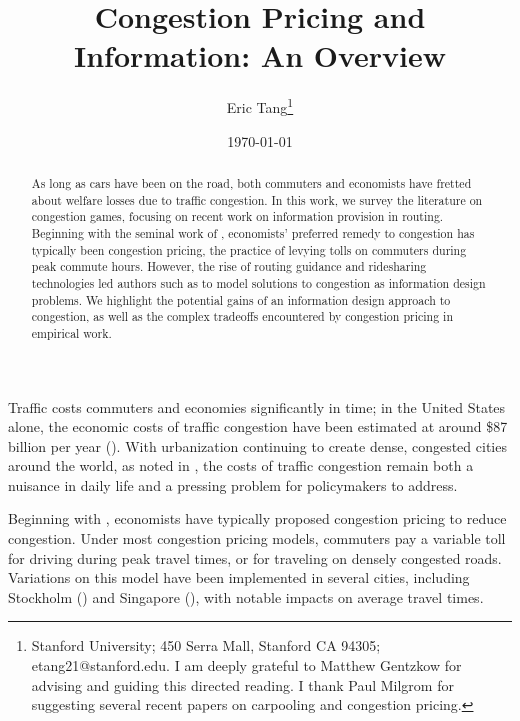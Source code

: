 \documentclass[JEL]{AEA}
\begin{document}
\title{Congestion Pricing and Information: An Overview}
\author{Eric Tang\thanks{%
Stanford University; 450 Serra Mall, Stanford CA 94305; etang21@stanford.edu.
I am deeply grateful to Matthew Gentzkow for advising and guiding this directed reading. I thank Paul Milgrom for suggesting several recent papers on carpooling and congestion pricing.
}}
\date{\today}
\pubVolume{}
\pubIssue{}

\begin{abstract}
As long as cars have been on the road, both commuters and economists have fretted about welfare losses due to traffic congestion. In this work, we survey the literature on congestion games, focusing on recent work on information provision in routing. Beginning with the seminal work of \cite{vickrey-1969}, economists' preferred remedy to congestion has typically been congestion pricing, the practice of levying tolls on commuters during peak commute hours. However, the rise of routing guidance and ridesharing technologies led authors such as \cite{das-2017} to model solutions to congestion as information design problems. We highlight the potential gains of an information design approach to congestion, as well as the complex tradeoffs encountered by congestion pricing in empirical work.
\end{abstract}

\maketitle

Traffic costs commuters and economies significantly in time; in the United States alone, the economic costs of traffic congestion have been estimated at around \$87 billion per year (\cite{fleming-2018}). With urbanization continuing to create dense, congested cities around the world, as noted in \cite{bryan-2020}, the costs of traffic congestion remain both a nuisance in daily life and a pressing problem for policymakers to address.

Beginning with \cite{vickrey-1969}, economists have typically proposed congestion pricing to reduce congestion. Under most congestion pricing models, commuters pay a variable toll for driving during peak travel times, or for traveling on densely congested roads. Variations on this model have been implemented in several cities, including Stockholm (\cite{eliasson-2006}) and Singapore (\cite{olszweski-2005}), with notable impacts on average travel times.
\end{document}

